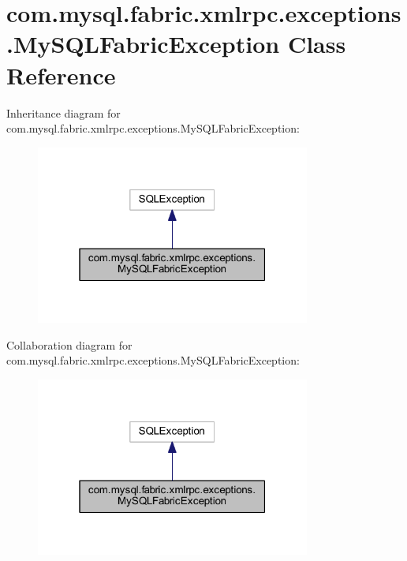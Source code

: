 \hypertarget{classcom_1_1mysql_1_1fabric_1_1xmlrpc_1_1exceptions_1_1_my_s_q_l_fabric_exception}{}\section{com.\+mysql.\+fabric.\+xmlrpc.\+exceptions.\+My\+S\+Q\+L\+Fabric\+Exception Class Reference}
\label{classcom_1_1mysql_1_1fabric_1_1xmlrpc_1_1exceptions_1_1_my_s_q_l_fabric_exception}


Inheritance diagram for com.\+mysql.\+fabric.\+xmlrpc.\+exceptions.\+My\+S\+Q\+L\+Fabric\+Exception\+:\nopagebreak
\begin{figure}[H]
\begin{center}
\leavevmode
\includegraphics[width=256pt]{classcom_1_1mysql_1_1fabric_1_1xmlrpc_1_1exceptions_1_1_my_s_q_l_fabric_exception__inherit__graph}
\end{center}
\end{figure}


Collaboration diagram for com.\+mysql.\+fabric.\+xmlrpc.\+exceptions.\+My\+S\+Q\+L\+Fabric\+Exception\+:\nopagebreak
\begin{figure}[H]
\begin{center}
\leavevmode
\includegraphics[width=256pt]{classcom_1_1mysql_1_1fabric_1_1xmlrpc_1_1exceptions_1_1_my_s_q_l_fabric_exception__coll__graph}
\end{center}
\end{figure}

